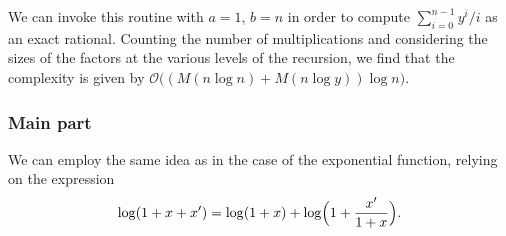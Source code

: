 We can invoke this routine with $a = 1$, $b = n$ in order to compute 
$\sum_{i=0}^{n-1} y^i / i$ as an exact rational.  Counting the 
number of multiplications and considering the sizes of the factors 
at the various levels of the recursion, we find that the complexity 
is given by $\mathcal{O}\bigl((M(n \log n) + M(n \log y) )\log n\bigr)$.

\subsubsection{Main part}

We can employ the same idea as in the case of the exponential 
function, relying on the expression 
\begin{equation}
\log(1 + x + x') = \log(1 + x) + \log \Bigl(1 + \frac{x'}{1+x}\Bigr).
\end{equation}

